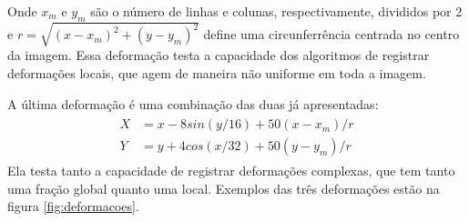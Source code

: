Onde $x_m$ e $y_m$ são o número de linhas e colunas, respectivamente, divididos por 2 e $r = \sqrt{(x-x_m)^2 + (y-y_m)^2}$
define uma circunferrência centrada no centro da imagem. Essa deformação testa a capacidade dos algoritmos de registrar
deformações locais, que agem de maneira não uniforme em toda a imagem.

	A última deformação é uma combinação das duas já apresentadas:
\begin{align} \label{math:composta}
\begin{split}
	X &= x-8sin(y/16) + 50(x-x_m)/r \\
	Y &= y+4cos(x/32) + 50(y-y_m)/r
\end{split} 
\end{align}
	Ela testa tanto a capacidade de registrar deformações complexas, que tem tanto uma fração global quanto uma local. 
Exemplos das três deformações estão na figura \ref{fig:deformacoes}.

